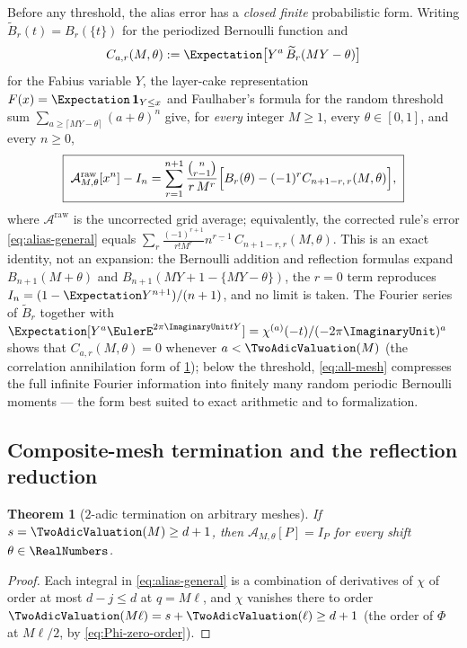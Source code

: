 \documentclass[11pt,oneside]{article}
\numberwithin{equation}{section}
\newtheorem{theorem}{Theorem}[section]
\theoremstyle{definition}
\theoremstyle{remark}
\newcommand{\fall}[2]{#1^{\underline{#2}}}
\begin{document}
Before any threshold, the alias error has a \emph{closed finite}
probabilistic form.  Writing $\widetilde B_r(t)=B_r(\{t\})$ for the
periodized Bernoulli function and
\begin{equation}
 C_{a,r}(M,\theta):=\Expectation\bigl[Y^{a}\,\widetilde B_r(MY-\theta)\bigr]
 \label{eq:alias-correlation}
\end{equation}
for the Fabius variable $Y$, the layer-cake representation
$F(x)=\Expectation\,\mathbf 1_{Y\le x}$ and Faulhaber's formula for the random
threshold sum $\sum_{a\ge\lceil MY-\theta\rceil}(a+\theta)^{n}$ give,
for \emph{every} integer $M\ge1$, every $\theta\in[0,1]$, and every
$n\ge0$,
\begin{equation}
 \boxed{\;
 \mathcal A^{\mathrm{raw}}_{M,\theta}[x^{n}]-I_n
 =\sum_{r=1}^{n+1}\frac{\binom n{r-1}}{r\,M^{r}}
 \Bigl[B_r(\theta)-(-1)^{r}C_{n+1-r,\,r}(M,\theta)\Bigr],\;}
 \label{eq:all-mesh}
\end{equation}
where $\mathcal A^{\mathrm{raw}}$ is the uncorrected grid average;
equivalently, the corrected rule's error \eqref{eq:alias-general} equals
$\sum_{r}\frac{(-1)^{r+1}}{r!M^{r}}\fall n{r-1}\,C_{n+1-r,r}(M,\theta)$.
This is an exact identity, not an expansion: the Bernoulli addition and
reflection formulas expand $B_{n+1}(M+\theta)$ and
$B_{n+1}(MY+1-\{MY-\theta\})$, the $r=0$ term reproduces
$I_n=(1-\Expectation Y^{n+1})/(n+1)$, and no limit is taken.  The Fourier series
of $\widetilde B_r$ together with
$\Expectation[Y^{a}\EulerE^{2\pi\ImaginaryUnit tY}]=\chi^{(a)}(-t)/(-2\pi\ImaginaryUnit)^{a}$ shows that
$C_{a,r}(M,\theta)=0$ whenever $a<\TwoAdicValuation(M)$ (the correlation
annihilation form of \cref{thm:composite-termination}); below the
threshold, \eqref{eq:all-mesh} compresses the full infinite Fourier
information into finitely many random periodic Bernoulli moments ---
the form best suited to exact arithmetic and to formalization.

\subsection{Composite-mesh termination and the reflection reduction}

\begin{theorem}[$2$-adic termination on arbitrary meshes]
\label{thm:composite-termination}
If $s=\TwoAdicValuation(M)\ge d+1$, then
$\mathcal A_{M,\theta}[P]=I_P$ for \emph{every} shift $\theta\in\RealNumbers$.
\end{theorem}

\begin{proof}
Each integral in \eqref{eq:alias-general} is a combination of
derivatives of $\chi$ of order at most $d-j\le d$ at $q=M\ell$, and
$\chi$ vanishes there to order $\TwoAdicValuation(M\ell)=s+\TwoAdicValuation(\ell)\ge d+1$ (the
order of $\Phi$ at $M\ell/2$, by \eqref{eq:Phi-zero-order}).
\end{proof}
\end{document}

